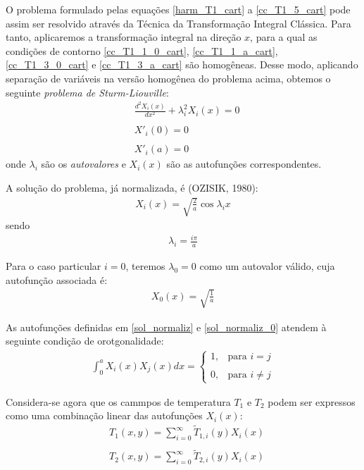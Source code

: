 O problema formulado pelas equações \eqref{harm_T1_cart} a \eqref{cc_T1_5_cart} pode assim ser resolvido através da
Técnica da Transformação Integral Clássica. Para tanto, aplicaremos a transformação integral
na direção $x$, para a qual as condições de contorno \eqref{cc_T1_1_0_cart}, \eqref{cc_T1_1_a_cart},
\eqref{cc_T1_3_0_cart} e \eqref{cc_T1_3_a_cart} são homogêneas. Desse modo, aplicando separação de variáveis
na versão homogênea do problema acima, obtemos o seguinte \textit{problema de Sturm-Liouville}:
\begin{align}
	& \frac{d^2 X_i(x)}{d x^2} + \lambda_i^2 X_i(x) = 0 \label{prob_autofuncao_x} \\ \nonumber \\
	& X'_i(0) = 0 \label{condicao_cont_x_0}\\ \nonumber \\
	& X'_i(a) = 0 \label{condicao_cont_x_a}
\end{align}
onde $\lambda_i$ são os \textit{autovalores} e $X_i(x)$ são as autofunções correspondentes.

A solução do problema, já normalizada, é (OZISIK, 1980):
\begin{align}
	X_i(x) = \sqrt{\frac{2}{a}}\cos\lambda_i x \label{sol_normaliz}
\end{align}
sendo
\begin{align}
	\lambda_i = \frac{i\pi}{a}
\end{align}

Para o caso particular $i = 0$, teremos $\lambda_0 = 0$ como um autovalor válido, cuja autofunção associada é:
\begin{align}
	X_0(x) = \sqrt{\frac{1}{a}} \label{sol_normaliz_0}
\end{align}

As autofunções definidas em \eqref{sol_normaliz} e \eqref{sol_normaliz_0} atendem à seguinte condição de orotgonalidade:
\begin{align}
	\int_0^a X_i(x)X_j(x)dx = 
	\left\lbrace
		\begin{matrix}
			1, & \text{para } i = j \\ \\
			0, & \text{para }i \ne j 
		\end{matrix}
	\right.
\end{align}

Considera-se agora que os cammpos de temperatura $T_1$ e $T_2$ podem ser expressos como uma combinação linear
das autofunções $X_i(x)$:
\begin{align}
	& T_1(x, y) = \sum_{i=0}^\infty \tilde{T}_{1, i}(y)X_i(x) \label{expansao_T1} \\ \nonumber \\
	& T_2(x, y) = \sum_{i=0}^\infty \tilde{T}_{2, i}(y)X_i(x) \label{expansao_T2} 
\end{align}

